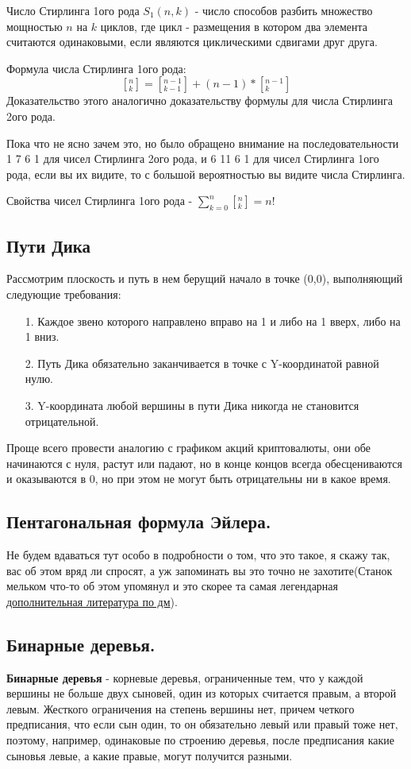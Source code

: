 \documentclass{article}
\begin{document}
Число Стирлинга 1ого рода $S_1(n, k)$ - число способов разбить множество мощностью $n$ на $k$ циклов, где цикл - размещения в котором два элемента считаются одинаковыми, если являются циклическими сдвигами друг друга. 

Формула числа Стирлинга 1ого рода: $$\left[_k^n\right] = \left[_{k-1}^{n-1}\right] + (n-1)*[^{n-1}_k]$$
Доказательство этого аналогично доказательству формулы для числа Стирлинга 2ого рода.

Пока что не ясно зачем это, но было обращено внимание на последовательности 1 7 6 1 для чисел Стирлинга 2ого рода, и 6 11 6 1 для чисел Стирлинга 1ого рода, если вы их видите, то с большой вероятностью вы видите числа Стирлинга.

Свойства чисел Стирлинга 1ого рода - $\sum\limits_{k=0}^n[_k^n] = n!$ 
\subsection{Пути Дика}
Рассмотрим плоскость и путь в нем берущий начало в точке (0,0), выполняющий следующие требования:
\begin{enumerate}
    \item [1.] Каждое звено которого направлено вправо на 1 и либо на 1 вверх, либо на 1 вниз.
    \item [2.] Путь Дика обязательно заканчивается в точке с Y-координатой равной нулю.
    \item [3.] Y-координата любой вершины в пути Дика никогда не становится отрицательной.
\end{enumerate}

Проще всего провести аналогию с графиком акций криптовалюты, они обе начинаются с нуля, растут или падают, но в конце концов всегда обесцениваются и оказываются в 0, но при этом не могут быть отрицательны ни в какое время.  

\subsection{Пентагональная формула Эйлера.}

Не будем вдаваться тут особо в подробности о том, что это такое, я скажу так, вас об этом вряд ли спросят, а уж запоминать вы это точно не захотите(Станок мельком что-то об этом упомянул и это скорее та самая легендарная \href{https://dev.mccme.ru/~merzon/mirror/mathtabletalks/files/pentagonal%20(1).pdf}{дополнительная литература по дм}).

\subsection{Бинарные деревья.}
\textbf{Бинарные деревья} - корневые деревья, ограниченные тем, что у каждой вершины не больше двух сыновей, один из которых считается правым, а второй левым. Жесткого ограничения на степень вершины нет, причем четкого предписания, что если сын один, то он обязательно левый или правый тоже нет, поэтому, например, одинаковые по строению деревья, после предписания какие сыновья левые, а какие правые, могут получится разными.
\end{document}
